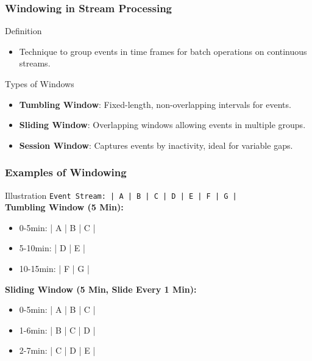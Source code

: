 \documentclass[aspectratio=169]{beamer}
\begin{document}
\begin{frame}[fragile]
    \frametitle{Windowing in Stream Processing}
    \begin{block}{Definition}
        \begin{itemize}
            \item Technique to group events in time frames for batch operations on continuous streams.
        \end{itemize}
    \end{block}

    \begin{block}{Types of Windows}
        \begin{itemize}
            \item \textbf{Tumbling Window}: Fixed-length, non-overlapping intervals for events.
            \item \textbf{Sliding Window}: Overlapping windows allowing events in multiple groups.
            \item \textbf{Session Window}: Captures events by inactivity, ideal for variable gaps.
        \end{itemize}
    \end{block}
\end{frame}

\begin{frame}[fragile]
    \frametitle{Examples of Windowing}
    \begin{block}{Illustration}
        \texttt{Event Stream: | A | B | C | D | E | F | G |}
        \vspace{5pt} \\
        \textbf{Tumbling Window (5 Min):}
        \begin{itemize}
            \item 0-5min: | A | B | C |
            \item 5-10min: | D | E     |
            \item 10-15min: | F | G     |
        \end{itemize}
        \vspace{5pt}
        \textbf{Sliding Window (5 Min, Slide Every 1 Min):}
        \begin{itemize}
            \item 0-5min: | A | B | C |
            \item 1-6min: | B | C | D |
            \item 2-7min: | C | D | E |
        \end{itemize}
    \end{block}
\end{frame}
\end{document}
